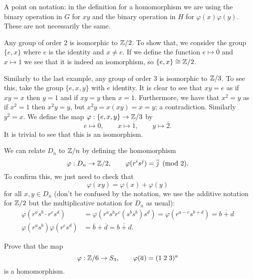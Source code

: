 \begin{remark}
    A point on notation: in the definition for a homomorphism we are using the
    binary operation in $G$ for $xy$ and the binary operation in $H$ for
    $\varphi(x)\varphi(y)$.
    These are not necessarily the same.
\end{remark}

\begin{example}
    Any group of order $2$ is isomorphic to $\mathbb{Z}/2$.
    To show that, we consider the group $\{e, x\}$ where $e$
    is the identity and $x \neq e$.
    If we define the function
    $e \mapsto \overline 0$
    and
    $x \mapsto \overline 1$
    we see that it is indeed an isomorphism, so $\{e, x\} \cong \mathbb{Z}/2$.
\end{example}

\begin{example}
    Similarly to the last example, any group of order $3$ is
    isomorphic to $\mathbb{Z}/3$.
    To see this, take the group $\{e,x,y\}$ with $e$ identity.
    It is clear to see that $xy = e$ as if $xy = x$ then $y = 1$ and
    if $xy = y$ then $x = 1$.
    Furthermore, we have that $x^2 = y$ as if $x^2 = 1$ then
    $x^2y = y$, but $x^2y = x(xy) = x = y$; a contradiction.
    Similarly $y^2 = x$.
    We define the map $\varphi:\{e,x,y\} \to \mathbb{Z}/3$ by
    \[
        e \mapsto \overline 0, \qquad x \mapsto \overline 1,
        \qquad y \mapsto \overline 2.
    \]
    It is trivial to see that this is an isomorphism.
\end{example}

\begin{example}
    We can relate $D_n$ to $\mathbb{Z}/n$ by defining the homomorphism 
    \[
        \varphi: D_n \to \mathbb{Z}/2, \qquad \varphi(r^is^j) = \overline j \pmod 2.
    \]
    To confirm this, we just need to check that
    \[
        \varphi(xy) = \varphi(x) + \varphi(y)
    \]
    for all $x,y \in D_n$ 
    (don't be confused by the notation, we use the additive notation for
    $\mathbb{Z}/2$ but the multiplicative notation for $D_n$ as usual):
    \begin{align*}
        \varphi(r^as^b\cdot r^cs^d)
        &= \varphi(r^as^br^c(s^bs^b)s^d)
        = \varphi(r^{a-c}s^{b+d})
        = \overline{b + d} \\
        \varphi(r^as^b)\varphi(r^cs^d)
        &= \overline b + \overline d
        = \overline{b + d}.
    \end{align*}
\end{example}

\begin{example}
    Prove that the map
    \[
        \varphi: \mathbb{Z}/6 \to S_3, \qquad \varphi(\overline a) = (1\;2\;3)^a
    \]
    is a homomorphism.
\end{example}

